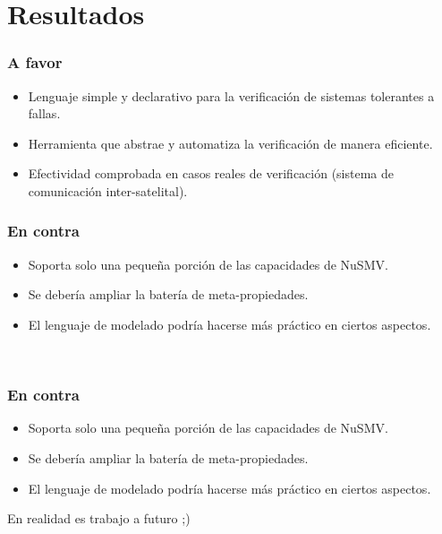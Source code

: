 \documentclass[serif]{beamer}
\begin{document}
\section{Resultados}
\begin{frame}
\frametitle{A favor}
\begin{itemize}\itemsep15pt

\item Lenguaje simple y declarativo para la verificación de sistemas tolerantes 
a fallas.

\item Herramienta que abstrae y automatiza la verificación de manera eficiente.

\item Efectividad comprobada en casos reales de verificación (sistema de 
comunicación inter-satelital).

\end{itemize}
\end{frame}


\begin{frame}
\frametitle{En contra}
\begin{itemize}\itemsep15pt
\item Soporta solo una pequeña porción de las capacidades de NuSMV.
\item Se debería ampliar la batería de meta-propiedades.
\item El lenguaje de modelado podría hacerse más práctico en ciertos aspectos.
\end{itemize}
\vspace{15pt}
\begin{center}{\LARGE ~}\end{center}
\end{frame}


\begin{frame}
\frametitle{En contra}
\begin{itemize}\itemsep15pt
\item Soporta solo una pequeña porción de las capacidades de NuSMV.
\item Se debería ampliar la batería de meta-propiedades.
\item El lenguaje de modelado podría hacerse más práctico en ciertos aspectos.
\end{itemize}
\vspace{15pt}
\begin{center}{\color{red} \LARGE En realidad es trabajo a futuro ;)}\end{center}
\end{frame}
\end{document}
